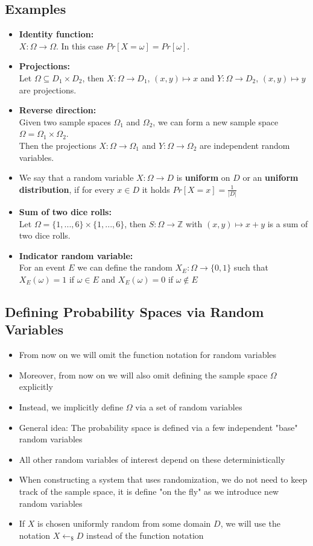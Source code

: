 		\subsection{Examples}
			\begin{itemize}
				\item \textbf{Identity function:}\\
					$X: \Omega \to \Omega$. In this case $Pr[X=\omega] = Pr[\omega]$.
				\item \textbf{Projections:}\\
					Let $\Omega \subseteq D_1 \times D_2$, then $X: \Omega \to D_1$, $(x,y) \mapsto x$ and $Y: \Omega \to D_2$, $(x,y) \mapsto y$ are projections.
				\item \textbf{Reverse direction:}\\
					Given two sample spaces $\Omega_1$ and $\Omega_2$, we can form a new sample space $\Omega = \Omega_1 \times \Omega_2$.\\
					Then the projections $X: \Omega \to \Omega_1$ and $Y: \Omega \to \Omega_2$ are independent random variables.
				\item We say that a random variable $X: \Omega \to D$ is \textbf{uniform} on $D$ or an \textbf{uniform distribution}, if for every $x \in D$ 
					it holds $Pr[X=x] = \frac{1}{|D|}$
				\item \textbf{Sum of two dice rolls:}\\
					Let $\Omega = \{1,...,6\} \times \{1,...,6\}$, then $S: \Omega \to \mathbb{Z}$ with $(x,y) \mapsto x+y$ is a sum of two dice rolls.
				\item \textbf{Indicator random variable:}\\
				For an event $E$ we can define the random $X_E: \Omega \to \{0,1\}$ such that $X_E(\omega)=1$ if $\omega \in E$ and $X_E(\omega)=0$ if $\omega\notin E$
			\end{itemize}
		
		\subsection{Defining Probability Spaces via Random Variables}
			\begin{itemize}
				\item From now on we will omit the function notation for random variables
				\item Moreover, from now on we will also omit defining the sample space $\Omega$ explicitly
				\item Instead, we implicitly define $\Omega$ via a set of random variables
				\item General idea: The probability space is defined via a few independent "base" random variables
				\item All other random variables of interest depend on these deterministically
				\item When constructing a system that uses randomization, we do not need to keep track of the sample space, it is define "on the fly" as we introduce new random
				variables
				\item If $X$ is chosen uniformly random from some domain $D$, we will use the notation $X \leftarrow_{\$} D$ instead of the function notation
			\end{itemize}
		
